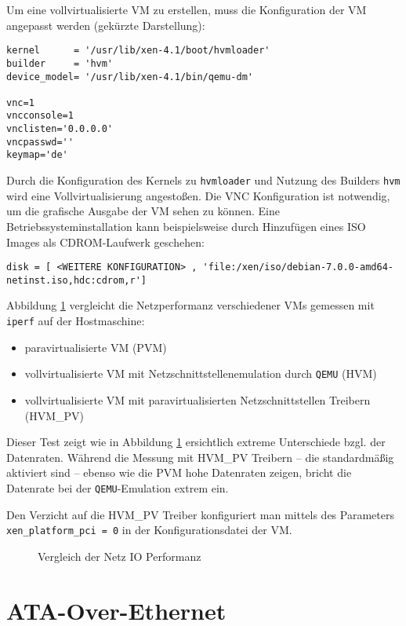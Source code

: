 Um eine vollvirtualisierte VM zu erstellen, muss die Konfiguration der VM angepasst werden (gekürzte Darstellung):
\setupVerbatimOut
\begin{verbatim}
kernel      = '/usr/lib/xen-4.1/boot/hvmloader'
builder     = 'hvm'
device_model= '/usr/lib/xen-4.1/bin/qemu-dm'

vnc=1
vncconsole=1
vnclisten='0.0.0.0'
vncpasswd=''
keymap='de'
\end{verbatim}

Durch die Konfiguration des Kernels zu \verb#hvmloader# und Nutzung des Builders \verb#hvm# wird eine Vollvirtualisierung angestoßen. Die VNC Konfiguration ist notwendig, um die grafische Ausgabe der VM sehen zu können. Eine Betriebssysteminstallation kann beispielsweise durch Hinzufügen eines ISO Images als CDROM-Laufwerk geschehen: 
\setupVerbatimOut
\begin{verbatim}
disk = [ <WEITERE KONFIGURATION> , 'file:/xen/iso/debian-7.0.0-amd64-netinst.iso,hdc:cdrom,r']
\end{verbatim}

Abbildung \ref{megaplot} vergleicht die Netzperformanz verschiedener VMs gemessen mit \verb#iperf# auf der Hostmaschine:
\begin{itemize}
\item paravirtualisierte VM (PVM)
\item vollvirtualisierte VM mit Netzschnittstellenemulation durch \verb#QEMU# (HVM)
\item vollvirtualisierte VM mit paravirtualisierten Netzschnittstellen Treibern (HVM\_PV)
\end{itemize}

Dieser Test zeigt wie in Abbildung \ref{megaplot} ersichtlich extreme Unterschiede bzgl. der Datenraten. Während die Messung mit HVM\_PV Treibern -- die standardmäßig aktiviert sind -- ebenso wie die PVM hohe Datenraten zeigen, bricht die Datenrate bei der \verb#QEMU#-Emulation extrem ein.

Den Verzicht auf die HVM\_PV Treiber konfiguriert man mittels des Parameters \verb#xen_platform_pci = 0# in der Konfigurationsdatei der VM.

\begin{figure}

\caption{Vergleich der Netz IO Performanz}
\label{megaplot}
\end{figure}
\chapter{ATA-Over-Ethernet}
\label{chap:aoe}
